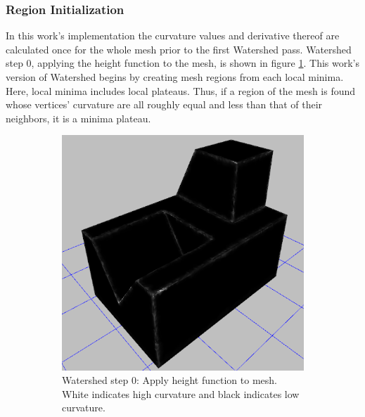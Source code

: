 \subsubsection{Region Initialization}
In this work's implementation the curvature values and derivative thereof are calculated once for the whole mesh prior to the first Watershed pass.
Watershed step 0, applying the height function to the mesh, is shown in figure \ref{sfig:ws_dk}.
This work's version of Watershed begins by creating mesh regions from each local minima.
Here, local minima includes local plateaus.
Thus, if a region of the mesh is found whose vertices' curvature are all roughly equal and less than that of their neighbors, it is a minima plateau.

\begin{figure}[htb]
	\centering
	\begin{subfigure}{0.45\textwidth}
		\centering
		\includegraphics[width=\linewidth]{../resources/watershed/fc028_WS0.png}
		\caption{Watershed step 0: Apply height function to mesh. White indicates high curvature and black indicates low curvature.}
		\label{sfig:ws_dk}
	\end{subfigure}
	\hfill
	\begin{subfigure}{0.45\textwidth}
		\centering

\end{subfigure}
\end{figure}

